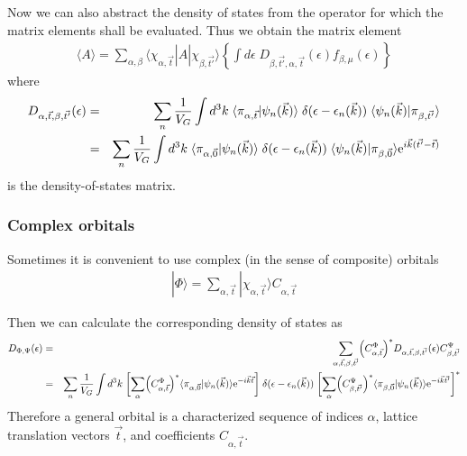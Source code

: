 \documentclass[11pt,a4paper]{report}
\begin{document}
Now we can also abstract the density of states from the operator for
which the matrix elements shall be evaluated.
Thus we obtain the matrix element
\begin{eqnarray}
\langle{A}\rangle=
\sum_{\alpha,\beta}\langle\chi_{\alpha,\vec{t}}|\hat{A}|\chi_{\beta,\vec{t'}}\rangle
\left\lbrace\int d\epsilon\; D_{\beta,\vec{t'},\alpha,\vec{t}}(\epsilon)
f_{\beta,\mu}(\epsilon)\right\rbrace
\end{eqnarray}
where
\begin{eqnarray}
D_{\alpha,\vec{t},\beta,\vec{t'}}(\epsilon)
&=&
\sum_n\frac{1}{V_G}\int d^3k\; 
\langle\pi_{\alpha,\vec{t}}|\psi_n(\vec{k})\rangle
\;\delta(\epsilon-\epsilon_n(\vec{k}))\;
\langle\psi_n(\vec{k})|\pi_{\beta,\vec{t'}}\rangle
\nonumber\\
&=&
\sum_n\frac{1}{V_G}\int d^3k\; 
\langle\pi_{\alpha,\vec{0}}|\psi_n(\vec{k})\rangle
\;\delta(\epsilon-\epsilon_n(\vec{k}))\;
\langle\psi_n(\vec{k})|\pi_{\beta,\vec{0}}\rangle\mathrm{e}^{i\vec{k}(\vec{t'}-\vec{t})}
\end{eqnarray}
is the density-of-states matrix.

\subsubsection{Complex orbitals}
Sometimes it is convenient to use complex (in the sense of composite)
orbitals
\begin{eqnarray}
|\Phi\rangle=\sum_{\alpha,\vec{t}}|\chi_{\alpha,\vec{t}}\rangle C_{\alpha,\vec{t}}
\label{eq:defcomplexorbital}
\end{eqnarray}

Then we can calculate the corresponding density of states
as
\begin{eqnarray}
D_{\Phi,\Psi}(\epsilon)
&=&\sum_{\alpha,\vec{t},\beta,\vec{t'}}
\Bigl(C^\Phi_{\alpha,\vec{t}}\Bigr)^*
D_{\alpha,\vec{t},\beta,\vec{t'}}(\epsilon)
C^\Psi_{\beta,\vec{t'}}
\nonumber\\
&=&
\sum_n\frac{1}{V_G}\int d^3k\; 
\biggl[\sum_\alpha \Bigl(C^\Phi_{\alpha,\vec{t}}\Bigr)^*
\langle\pi_{\alpha,\vec{0}}|\psi_n(\vec{k})\rangle
\mathrm{e}^{-i\vec{k}\vec{t}}
\biggr]
\;\delta(\epsilon-\epsilon_n(\vec{k}))\;
\biggl[\sum_\alpha 
\Bigl(C^\Psi_{\beta,\vec{t'}}\Bigr)^*
\langle\pi_{\beta,\vec{0}}|\psi_n(\vec{k})\rangle
\mathrm{e}^{-i\vec{k}\vec{t'}}
\biggr]^*
\nonumber\\
\end{eqnarray}
Therefore a general orbital is a characterized sequence of indices $\alpha$,
lattice translation vectors $\vec{t}$, and coefficients $C_{\alpha,\vec{t}}$.
\end{document}
